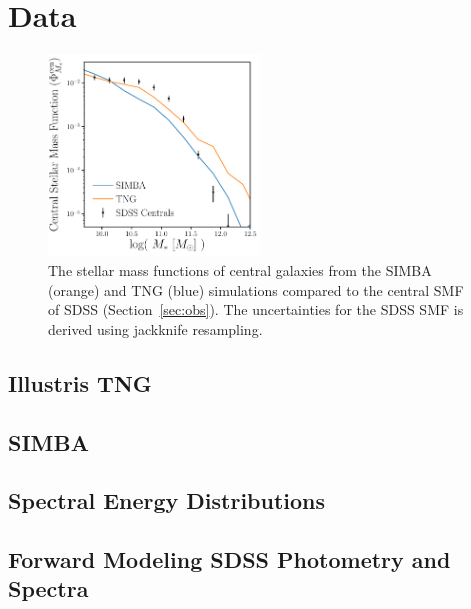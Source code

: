 \section{Data}\label{sec:sims}
\begin{figure}
\begin{center}
\includegraphics[width=0.5\textwidth]{figs/smfs.pdf} 
    \caption{The stellar mass functions of central galaxies from the SIMBA
    (orange) and TNG (blue) simulations compared to the central SMF of SDSS
    (Section~\ref{sec:obs}). The uncertainties for the SDSS SMF is derived
    using jackknife resampling.}
\label{fig:smf}
\end{center}
\end{figure}


\subsection{Illustris TNG} \label{sec:tng}

\subsection{SIMBA} \label{sec:tng}

\subsection{Spectral Energy Distributions} \label{sec:sed}

\subsection{Forward Modeling SDSS Photometry and Spectra} \label{sec:fm} 

